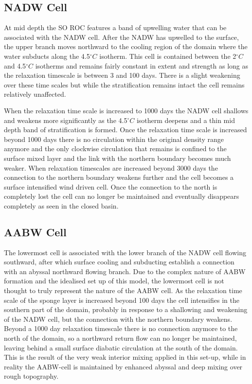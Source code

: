 \subsection{NADW Cell}
At mid depth the SO ROC features a band of upwelling water that can be associated with the NADW cell. After the NADW has upwelled to the surface, the upper branch moves northward to the cooling region of the domain where the water subducts along the 4.5$^{\circ}C$ isotherm. This cell is contained between the 2$^{\circ}C$ and 4.5$^{\circ}C$ isotherms and remains fairly constant in extent and strength as long as the relaxation timescale is between 3 and 100 days. There is a slight weakening over these time scales but while the stratification remains intact the cell remains relatively unaffected. 

When the relaxation time scale is increased to 1000 days the NADW cell shallows and weakens more significantly as the 4.5$^{\circ}C$ isotherm deepens and a thin mid depth band of stratification is formed. Once the relaxation time scale is increased beyond 1000 days there is no circulation within the original density range anymore and the only clockwise circulation that remains is confined to the surface mixed layer and the link with the northern boundary becomes much weaker. When relaxation timescales are increased beyond 3000 days the connection to the northern boundary weakens further and the cell becomes a surface intensified wind driven cell. Once the connection to the north is completely lost the cell can no longer be maintained and eventually disappears completely as seen in the closed basin.
\subsection{AABW Cell}
The lowermost cell is associated with the lower branch of the NADW cell flowing southward, after which surface cooling and subducting establish a connection with an abyssal northward flowing branch. Due to the complex nature of AABW formation and the idealised set up of this model, the lowermost cell is not thought to truly represent the nature of the AABW cell. As the relaxation time scale of the sponge layer is increased beyond 100 days the cell intensifies in the southern part of the domain, probably in response to a shallowing and weakening of the NADW cell, but the connection with the northern boundary weakens. Beyond a 1000 day relaxation timescale there is no connection anymore to the north of the domain, so a northward return flow can no longer be maintained, leaving behind a small surface diabatic circulation at the south of the domain. This is the result of the very weak interior mixing applied in this set-up, while in reality the AABW-cell is maintained by enhanced abyssal and deep mixing over rough topography.

